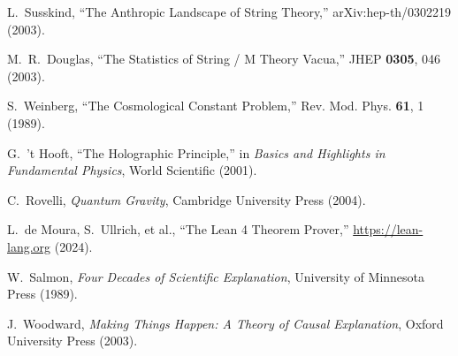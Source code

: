\documentclass[12pt]{article}
\theoremstyle{remark}
\begin{document}
\begin{thebibliography}{99}
L.~Susskind,
``The Anthropic Landscape of String Theory,''
arXiv:hep-th/0302219 (2003).

M.~R.~Douglas,
``The Statistics of String / M Theory Vacua,''
JHEP \textbf{0305}, 046 (2003).

S.~Weinberg,
``The Cosmological Constant Problem,''
Rev. Mod. Phys. \textbf{61}, 1 (1989).

G.~'t Hooft,
``The Holographic Principle,'' in \emph{Basics and Highlights in Fundamental Physics},
World Scientific (2001).

C.~Rovelli,
\emph{Quantum Gravity},
Cambridge University Press (2004).

L.~de Moura, S.~Ullrich, et al.,
``The Lean 4 Theorem Prover,''
\url{https://lean-lang.org} (2024).

W.~Salmon,
\emph{Four Decades of Scientific Explanation},
University of Minnesota Press (1989).

J.~Woodward,
\emph{Making Things Happen: A Theory of Causal Explanation},
Oxford University Press (2003).

\end{thebibliography}
\end{document}
